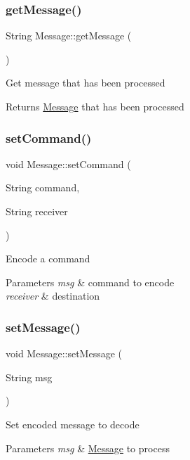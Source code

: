 \subsubsection{\texorpdfstring{get\+Message()}{getMessage()}}
{\footnotesize\ttfamily String Message\+::get\+Message (\begin{DoxyParamCaption}{ }\end{DoxyParamCaption})}

Get message that has been processed \begin{DoxyReturn}{Returns}
\hyperlink{class_message}{Message} that has been processed 
\end{DoxyReturn}
\mbox{\label{class_message_af187cbc29c2aa424efe7e442699cd167}} 
\subsubsection{\texorpdfstring{set\+Command()}{setCommand()}}
{\footnotesize\ttfamily void Message\+::set\+Command (\begin{DoxyParamCaption}\item[{String}]{command,  }\item[{String}]{receiver }\end{DoxyParamCaption})}

Encode a command 
\begin{DoxyParams}{Parameters}
{\em msg} & command to encode \\
\hline
{\em receiver} & destination \\
\hline
\end{DoxyParams}
\mbox{\label{class_message_a05999d64722c0f0149391b684db391d0}} 
\subsubsection{\texorpdfstring{set\+Message()}{setMessage()}}
{\footnotesize\ttfamily void Message\+::set\+Message (\begin{DoxyParamCaption}\item[{String}]{msg }\end{DoxyParamCaption})}

Set encoded message to decode 
\begin{DoxyParams}{Parameters}
{\em msg} & \hyperlink{class_message}{Message} to process \\
\hline
\end{DoxyParams}
\mbox{\label{class_message_a89957e73ddc9c7ecf3f79901a09e47ca}} 
